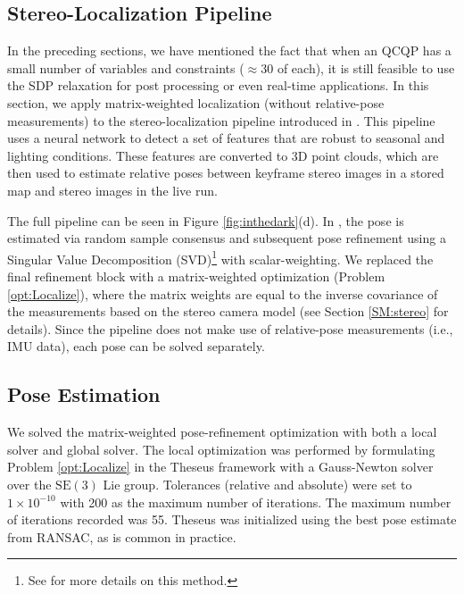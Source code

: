 \documentclass[lettersize,journal]{IEEEtran}
\begin{document}
\subsection{Stereo-Localization Pipeline}

In the preceding sections, we have mentioned the fact that when an QCQP has a small number of variables and constraints ($\approx 30$ of each), it is still feasible to use the SDP relaxation for post processing or even real-time applications. In this section, we apply matrix-weighted localization (without relative-pose measurements) to the stereo-localization pipeline introduced in \cite{gridsethKeepingEyeThings2022}. This pipeline uses a neural network to detect a set of features that are robust to seasonal and lighting conditions. These features are converted to 3D point clouds, which are then used to estimate relative poses between keyframe stereo images in a stored map and stereo images in the live run. 

The full pipeline can be seen in Figure \ref{fig:inthedark}(d). In \cite{gridsethKeepingEyeThings2022}, the pose is estimated via random sample consensus and subsequent pose refinement using a Singular Value Decomposition (SVD)\footnote{See \cite{umeyamaLeastSquaresEstimationTransformation1991} for more details on this method.} with scalar-weighting. We replaced the final refinement block with a matrix-weighted optimization (Problem \eqref{opt:Localize}), where the matrix weights are equal to the inverse covariance of the measurements based on the stereo camera model (see Section \ref{SM:stereo} for details). Since the pipeline does not make use of relative-pose measurements (i.e., IMU data), each pose can be solved separately. 

\subsection{Pose Estimation}

We solved the matrix-weighted pose-refinement optimization with both a local solver and global solver. The local optimization was performed by formulating Problem \eqref{opt:Localize} in the Theseus framework \cite{pinedaTheseusLibraryDifferentiable2022} with a Gauss-Newton solver over the $\mbox{SE}(3)$ Lie group. Tolerances (relative and absolute) were set to $1\times10^{-10}$ with 200 as the maximum number of iterations. The maximum number of iterations recorded was 55. Theseus was initialized using the best pose estimate from RANSAC, as is common in practice.
\end{document}
